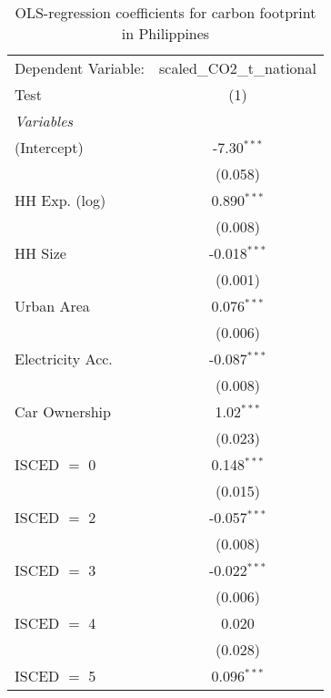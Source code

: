 
\begin{table}[htbp!]
   \centering
   \small
   \begin{adjustbox}{width = 1\textwidth, max height = 0.95\textheight, center}
      \begin{threeparttable}[b]
         \caption{\label{tab:OLS_2_PHL} OLS-regression coefficients for carbon footprint in Philippines}
         \begin{tabular}{lc}
            \tabularnewline \midrule \midrule
            Dependent Variable: & scaled\_CO2\_t\_national\\     
            Test                & (1)\\  
            \midrule
            \emph{Variables}\\
            (Intercept)         & -7.30$^{***}$\\   
                                & (0.058)\\   
            HH Exp. (log)       & 0.890$^{***}$\\   
                                & (0.008)\\   
            HH Size             & -0.018$^{***}$\\   
                                & (0.001)\\   
            Urban Area          & 0.076$^{***}$\\   
                                & (0.006)\\   
            Electricity Acc.    & -0.087$^{***}$\\   
                                & (0.008)\\   
            Car Ownership       & 1.02$^{***}$\\   
                                & (0.023)\\   
            ISCED $=$ 0         & 0.148$^{***}$\\   
                                & (0.015)\\   
            ISCED $=$ 2         & -0.057$^{***}$\\   
                                & (0.008)\\   
            ISCED $=$ 3         & -0.022$^{***}$\\   
                                & (0.006)\\   
            ISCED $=$ 4         & 0.020\\   
                                & (0.028)\\   
            ISCED $=$ 5         & 0.096$^{***}$\\   

\end{tabular}
\end{threeparttable}
\end{adjustbox}
\end{table}
